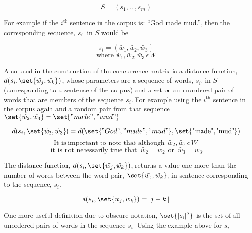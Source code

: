 \documentclass{article}
\begin{document}
\begin{equation*}
S = \left( s_1, \ldots, s_m \right)
\end{equation*}

For example if the $i^{\text{th}}$ sentence in the corpus is: ``God made mud.'', then the corresponding sequence, $s_i$, in $S$ would be

\begin{equation*}
s_i = \left( \tilde{w_1}, \tilde{w_2}, \tilde{w_3} \right)
\end{equation*}
\begin{equation*}
\text{where } \tilde{w_1}, \tilde{w_2}, \tilde{w_3} \, \epsilon \, W
\end{equation*}

Also used in the construction of the concurrence matrix is a distance function, $d(s_i, \set{\tilde{w_j}, \tilde{w_k}})$, whose parameters are a sequence of words, $s_i$, in $S$ (corresponding to a sentence of the corpus) and a set or an unordered pair of words that are members of the sequence $s_i$. For example using the $i^{\text{th}}$ sentence in the corpus again and a random pair from that sequence $\set{\tilde{w_2}, \tilde{w_3}} = \set{"made", "mud"}$

\begin{equation*}
d(s_i, \set{\tilde{w_2}, \tilde{w_3}}) = d(\set{"God", "made", "mud"}, \set{\text{"made"}, \text{"mud"}})
\end{equation*}
\begin{equation*}
\text{It is important to note that although }\, \tilde{w_2}, \tilde{w_3} \, \epsilon \, W \, 
\end{equation*}
\begin{equation*}
\text{ it is not necessarily true that } \, \tilde{w_2} = w_2 \, \text{ or } \, \tilde{w_3} = w_3.
\end{equation*}

The distance function, $d(s_i, \set{\tilde{w_j}, \tilde{w_k}})$, returns a value one more than the number of words between the word pair, $\set{\tilde{w_j}, \tilde{w_k}}$, in sentence corresponding to the sequence, $s_i$.

\begin{equation*}
d(s_i, \set{\tilde{w_j}, \tilde{w_k}}) = \mid j - k \mid
\end{equation*}

One more useful definition due to obscure notation, $\set{[s_i]^2}$ is the set of all unordered pairs of words in the sequence $s_i$. Using the example above for $s_i$
\end{document}
